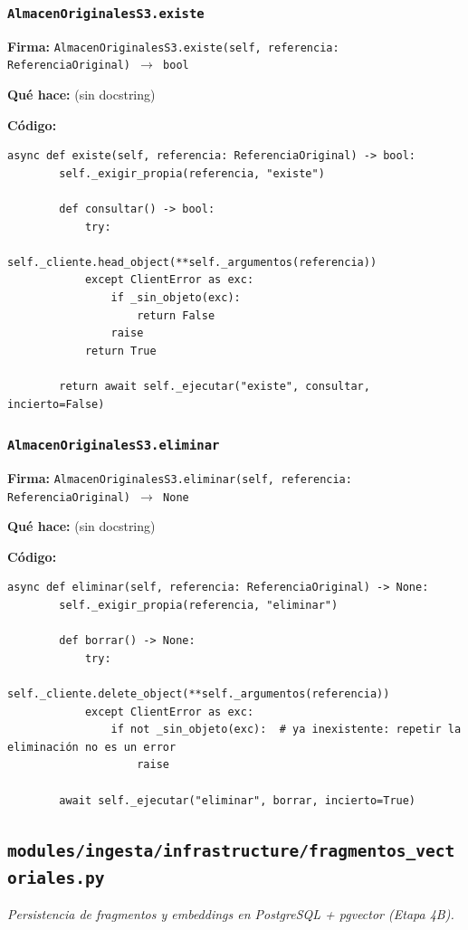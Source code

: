 \documentclass[11pt,a4paper]{article}
\begin{document}
\subsubsection*{\texttt{AlmacenOriginalesS3.existe}}
\textbf{Firma:} \texttt{AlmacenOriginalesS3.existe(self, referencia: ReferenciaOriginal) $\rightarrow$ bool}

\textbf{Qué hace:} (sin docstring)

\textbf{Código:}
\begin{lstlisting}
async def existe(self, referencia: ReferenciaOriginal) -> bool:
        self._exigir_propia(referencia, "existe")

        def consultar() -> bool:
            try:
                self._cliente.head_object(**self._argumentos(referencia))
            except ClientError as exc:
                if _sin_objeto(exc):
                    return False
                raise
            return True

        return await self._ejecutar("existe", consultar, incierto=False)
\end{lstlisting}

\subsubsection*{\texttt{AlmacenOriginalesS3.eliminar}}
\textbf{Firma:} \texttt{AlmacenOriginalesS3.eliminar(self, referencia: ReferenciaOriginal) $\rightarrow$ None}

\textbf{Qué hace:} (sin docstring)

\textbf{Código:}
\begin{lstlisting}
async def eliminar(self, referencia: ReferenciaOriginal) -> None:
        self._exigir_propia(referencia, "eliminar")

        def borrar() -> None:
            try:
                self._cliente.delete_object(**self._argumentos(referencia))
            except ClientError as exc:
                if not _sin_objeto(exc):  # ya inexistente: repetir la eliminación no es un error
                    raise

        await self._ejecutar("eliminar", borrar, incierto=True)
\end{lstlisting}

\subsection{\texttt{modules/ingesta/infrastructure/fragmentos\_vectoriales.py}}
\textit{Persistencia de fragmentos y embeddings en PostgreSQL + pgvector (Etapa 4B).}
\end{document}
